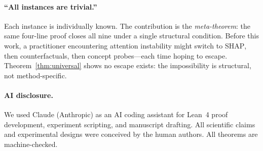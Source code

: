 \documentclass{article}
\newcommand{\SHAP}{\textsc{SHAP}}
\begin{document}
\paragraph{``All instances are trivial.''}
Each instance is individually known.  The contribution is the \emph{meta-theorem}: the same four-line proof closes all nine under a single structural condition.  Before this work, a practitioner encountering attention instability might switch to \SHAP{}, then counterfactuals, then concept probes---each time hoping to escape.  Theorem~\ref{thm:universal} shows no escape exists: the impossibility is structural, not method-specific.

\paragraph{AI disclosure.}
We used Claude (Anthropic) as an AI coding assistant for Lean~4 proof
development, experiment scripting, and manuscript drafting.  All
scientific claims and experimental designs were conceived by the human
authors.  All theorems are machine-checked.
\end{document}
